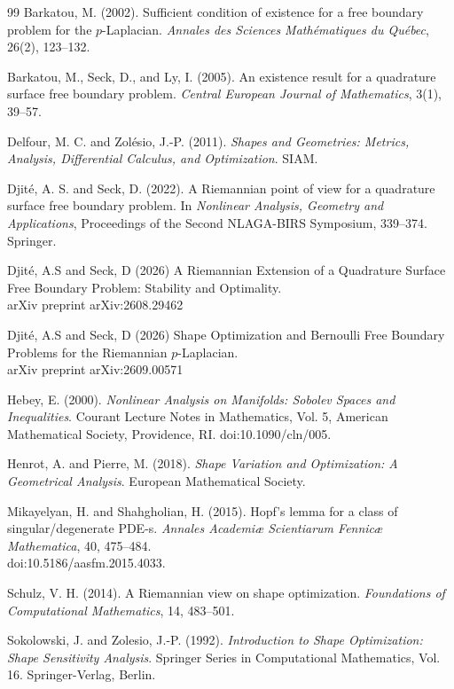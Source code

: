 \documentclass{article}
\begin{document}
\begin{thebibliography}{99}
Barkatou, M. (2002).
Sufficient condition of existence for a free boundary problem for the
$p$-Laplacian.
\emph{Annales des Sciences Math\'ematiques du Qu\'ebec}, 26(2),
123--132.

Barkatou, M., Seck, D., and Ly, I. (2005).
An existence result for a quadrature surface free boundary problem.
\emph{Central European Journal of Mathematics}, 3(1), 39--57.

Delfour, M. C. and Zol\'esio, J.-P. (2011).
\emph{Shapes and Geometries: Metrics, Analysis, Differential Calculus,
and Optimization}.
SIAM.


Djit\'e, A. S. and Seck, D. (2022).
A Riemannian point of view for a quadrature surface free boundary
problem.
In \emph{Nonlinear Analysis, Geometry and Applications}, Proceedings
of the Second NLAGA-BIRS Symposium, 339--374. Springer.

Djit\'e, A.S and Seck, D (2026)
  A Riemannian Extension of a Quadrature Surface Free Boundary Problem: Stability and Optimality.\\
  arXiv preprint arXiv:2608.29462

Djit\'e, A.S and Seck, D (2026)
  Shape Optimization and Bernoulli Free Boundary Problems for the Riemannian $ p $-Laplacian.\\
  arXiv preprint arXiv:2609.00571

Hebey, E. (2000).
\emph{Nonlinear Analysis on Manifolds: Sobolev Spaces and Inequalities}.
Courant Lecture Notes in Mathematics, Vol. 5,
American Mathematical Society, Providence, RI.
doi:10.1090/cln/005.

Henrot, A. and Pierre, M. (2018).
\emph{Shape Variation and Optimization: A Geometrical Analysis}.
European Mathematical Society.

Mikayelyan, H. and Shahgholian, H. (2015).
Hopf's lemma for a class of singular/degenerate PDE-s.
\emph{Annales Academiæ Scientiarum Fennicæ Mathematica},
40, 475--484.\\
doi:10.5186/aasfm.2015.4033.


Schulz, V. H. (2014).
A Riemannian view on shape optimization.
\emph{Foundations of Computational Mathematics}, 14, 483--501.


Sokolowski, J. and Zolesio, J.-P. (1992).
\emph{Introduction to Shape Optimization: Shape Sensitivity Analysis}.
Springer Series in Computational Mathematics, Vol. 16.
Springer-Verlag, Berlin.


\end{thebibliography}
\end{document}

